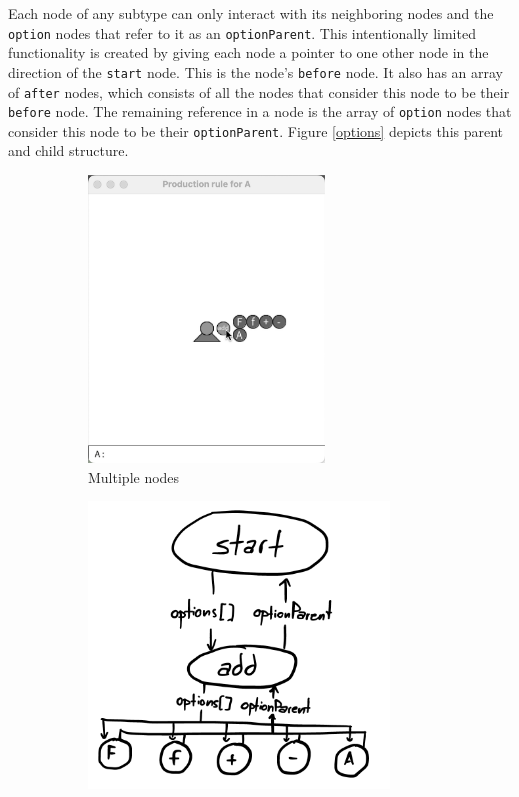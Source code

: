 \documentclass[12pt,twoside]{reedthesis}
\newcommand{\code}[1]{\texttt{#1}}
\begin{document}
	Each node of any subtype can only interact with its neighboring nodes and the \code{option} nodes that refer to it as an \code{optionParent}. This intentionally limited functionality is created by giving each node a pointer to one other node in the direction of the \code{start} node. This is the node's \code{before} node. It also has an array of \code{after} nodes, which consists of all the nodes that consider this node to be their \code{before} node. The remaining reference in a node is the array of \code{option} nodes that consider this node to be their \code{optionParent}. Figure \ref{options} depicts this parent and child structure.
	
	
	\begin{figure}[h]
	\begin{subfigure}{0.5\textwidth}
		\centering
		\includegraphics[height = 3in, frame]{Images/HowItWorks5}
		\caption{Multiple nodes}
		\label {HowItWorks5}
	\end{subfigure}
	\begin{subfigure}{0.5\textwidth}
		\centering
		\includegraphics[height=3in, frame]{Images/Diagram1}
		

\end{subfigure}
\end{figure}
\end{document}
